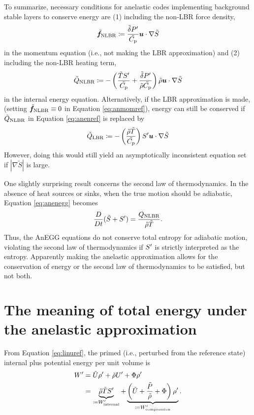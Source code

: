 \documentclass[12pt]{article}
\newcommand{\wint}{W^\prime_{\rm internal}}
\newcommand{\wcomp}{W^\prime_{\rm compression}}
\begin{document}
To summarize, necessary conditions for anelastic codes implementing background stable layers to conserve energy are (1) including the non-LBR force density,
\begin{align}\label{eq:nlbrmomref}
	\tilde{\bm{f}}_{\rm NLBR} \coloneqq\frac{\tilde{\delta} P^\prime}{\tilde{C_{\rm{p}}}} \bm{u}\cdot \nabla\tilde{S} 
\end{align}
in the momentum equation (i.e., not making the LBR approximation) and (2) including the non-LBR heating term,
\begin{align}\label{eq:nlbrheatref}
	\tilde{Q}_{\rm NLBR} \coloneqq -  \left(\frac{\tilde{T} S^\prime}{\tilde{C_{\rm{p}}}} + \frac{\tilde{\delta} P^\prime}{\tilde{\rho}\tilde{C_{\rm{p}}}}\right)  \tilde{\rho} \bm{u}\cdot\nabla\tilde{S}
\end{align}
in the internal energy equation. Alternatively, if the LBR approximation is made, (setting $\tilde{\bm{f}}_{\rm NLBR}\equiv0$ in Equation \eqref{eq:anmomref}), energy can still be conserved if $\tilde{Q}_{\rm NLBR}$ in Equation \eqref{eq:anenref} is replaced by
\begin{align}\label{eq:lbrheating}
	\tilde{Q}_{\rm LBR}\coloneqq - \left(\frac{\tilde{\rho}\tilde{T}}{\tilde{C_{\rm{p}}}} \right) S^\prime\bm{u}\cdot\nabla\tilde{S}
\end{align}
However, doing this would still yield an asymptotically inconsistent equation set if $|\nabla\tilde{S}|$ is large. 

One slightly surprising result concerns the second law of thermodynamics. In the absence of heat sources or sinks, when the true motion should be adiabatic, Equation \eqref{eq:anenegg} becomes
\begin{align}\label{eq:dsdtref}
	\frac{D}{Dt}(\tilde{S} + S^\prime) = \frac{Q_{\rm NLBR}}{\tilde{\rho}\tilde{T}}.
\end{align}
Thus, the AnEGG equations do not conserve total entropy for adiabatic motion, violating the second law of thermodynamics if $S^\prime$ is strictly interpreted as the entropy. Apparently making the anelastic approximation allows for the conservation of energy or the second law of thermodynamics to be satisfied, but not both. 

\section{The meaning of total energy under the anelastic approximation}
From Equation \eqref{eq:linuref}, the primed (i.e., perturbed from the reference state) internal plus potential energy per unit volume is 
\begin{align}\label{eq:perten1}
	W^\prime &= \tilde{U}\rhoprime + \rhotilde U^\prime + \Phi \rhoprime \nonumber\\
	&= \underbrace{\rhotilde\tilde{T} \entrprime}_{\define \wint} + \underbrace{\left(\tilde{U}+\frac{\tilde{P}}{\rhotilde}+\Phi\right)\rhoprime}_{\define\wcomp}.
\end{align}
\end{document}
